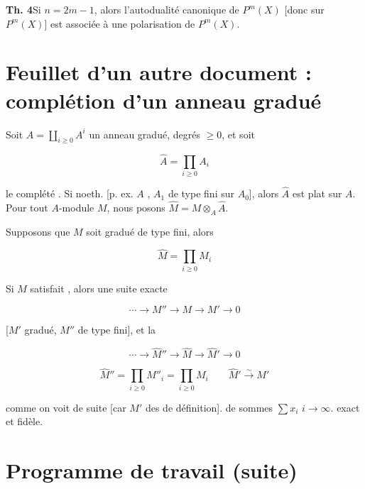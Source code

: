 \documentclass[11pt,a4paper]{article}
\begin{document}
\textbf{Th. 4}\quad Si $n = 2m-1$, alors l'autodualité canonique de $P^{m}(X)$
[donc \ill{} sur $P^{m}(X)$] est associée à une polarisation de $P^{m}(X)$.

\section*{Feuillet d'un autre document : complétion d'un anneau gradué}



Soit $A = \coprod_{i \geq 0} A^{i}$ un anneau gradué, \ill{} degrés $\geq 0$, et
soit

\[
  \hat{A} = \prod_{i \geq 0} A_{i}
\]

le complété \ill{}. Si \ill{} noeth. [p. ex. $A$ \ill{}, $A_{1}$ de type fini
sur $A_{0}$], alors $\hat{A}$ est plat sur $A$. Pour tout $A$-module $M$, nous
posons $\hat{M} = M \otimes_{A} \hat{A}$.

Supposons \ill{} que $M$ soit \ill{} gradué de type fini, alors \ill{}

\[
  \hat{M} = \prod_{i \geq 0} M_{i}
\]

Si $M$ satisfait \ill{}, alors \ill{} une suite exacte

\[
  \cdots \longrightarrow M'' \longrightarrow M \longrightarrow M' \longrightarrow 0
\]

[$M'$ \ill{} gradué, $M''$ de type fini], et la \ill{}

\[
  \cdots \longrightarrow \hat{M}'' \longrightarrow \hat{M} \longrightarrow \hat{M}' \longrightarrow 0
\]

\[
  \hat{M}'' = \prod_{i \geq 0} M''_{i} = \prod_{i \geq 0} M_{i}
  \qquad
  \hat{M}' \overset{\sim}{\longrightarrow} M'
\]

comme on voit de suite [car $M'$ \ill{} des \ill{} de définition]. \ill{} de
sommes $\sum x_{i}$ \ill{}  \ill{} $i \to \infty$. \ill{}
exact et fidèle.

\section*{Programme de travail (suite)}
\end{document}
